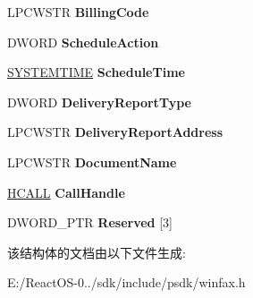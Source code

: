 \begin{DoxyCompactItemize}
L\+P\+C\+W\+S\+TR {\bfseries Billing\+Code}
\item 
\mbox{\label{struct___f_a_x___j_o_b___p_a_r_a_m_w_abc26d1b5454c165db185d0d691a4f3f8}} 
D\+W\+O\+RD {\bfseries Schedule\+Action}
\item 
\mbox{\label{struct___f_a_x___j_o_b___p_a_r_a_m_w_ac0536e5484212e30741e9237f36479d5}} 
\hyperlink{struct___s_y_s_t_e_m_t_i_m_e}{S\+Y\+S\+T\+E\+M\+T\+I\+ME} {\bfseries Schedule\+Time}
\item 
\mbox{\label{struct___f_a_x___j_o_b___p_a_r_a_m_w_a56568399e3695a66e12966f1ce13d8b8}} 
D\+W\+O\+RD {\bfseries Delivery\+Report\+Type}
\item 
\mbox{\label{struct___f_a_x___j_o_b___p_a_r_a_m_w_a0c563c511df789c556a132c13c87b069}} 
L\+P\+C\+W\+S\+TR {\bfseries Delivery\+Report\+Address}
\item 
\mbox{\label{struct___f_a_x___j_o_b___p_a_r_a_m_w_a12b42688156489a98439cb53bc38aac4}} 
L\+P\+C\+W\+S\+TR {\bfseries Document\+Name}
\item 
\mbox{\label{struct___f_a_x___j_o_b___p_a_r_a_m_w_a079b04a143db6c313ad4b2eb15f2c746}} 
\hyperlink{interfacevoid}{H\+C\+A\+LL} {\bfseries Call\+Handle}
\item 
\mbox{\label{struct___f_a_x___j_o_b___p_a_r_a_m_w_adc10933f59558a00908595cd098043f7}} 
D\+W\+O\+R\+D\+\_\+\+P\+TR {\bfseries Reserved} \mbox{[}3\mbox{]}
\end{DoxyCompactItemize}


该结构体的文档由以下文件生成\+:\begin{DoxyCompactItemize}
\item 
E\+:/\+React\+O\+S-\/0../sdk/include/psdk/winfax.\+h\end{DoxyCompactItemize}
